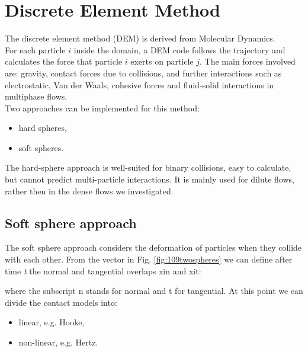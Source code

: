 
\chapter{Discrete Element Method}
\label{cap:dem}

The discrete element method (\acs{DEM}) is derived from Molecular Dynamics. \\ 
For each particle $i$ inside the domain, a \acs{DEM} code
follows the trajectory and calculates the force that particle $i$ exerts on
particle $j$.
The main forces involved are: gravity, contact forces due to collisions, and
further interactions such as electrostatic, Van der Waals, cohesive forces and fluid-solid interactions in 
multiphase flows. \\
Two approaches can be implemented for this method:
\begin{itemize}
  \item{hard spheres,}
  \item{soft spheres.}
\end{itemize} 
The hard-sphere approach is well-suited for binary collisions, easy to
calculate, but cannot predict multi-particle interactions.
It is mainly used for dilute flows, rather then in the dense flows we
investigated.


\section{Soft sphere approach}
\label{sec:softspheresapproach}


The soft sphere approach considers the deformation of particles when they
collide with each other. From the vector in Fig. \ref{fig:109twospheres} we can
define after time \textit{t} the normal and tangential overlaps \acs{xin} and
\acs{xit}:


where the subscript \acs{n} stands for normal and \acs{t} for tangential. 
At this point we can divide the contact models into:
\begin{itemize}
  \item{linear, e.g. Hooke,}
  \item{non-linear, e.g. Hertz.}
\end{itemize}

